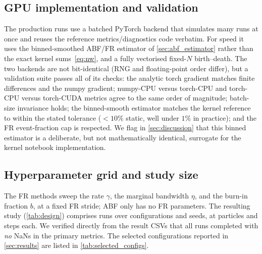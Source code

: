 \subsection{GPU implementation and validation}
The production runs use a batched PyTorch backend that simulates many runs at
once and reuses the reference metrics/diagnostics code verbatim. For speed it
uses the binned-smoothed ABF/FR estimator of \cref{sec:abf_estimator} rather
than the exact kernel sums~\eqref{eq:nw}, and a fully vectorised fixed-$N$
birth--death. The two backends are not bit-identical (RNG and floating-point
order differ), but a validation suite passes all of its checks: the analytic
torch gradient matches finite differences and the numpy gradient; numpy-CPU
versus torch-CPU and torch-CPU versus torch-CUDA metrics agree to the same
order of magnitude; batch-size invariance holds; the binned-smooth estimator
matches the kernel reference to within the stated tolerance ($<10\%$ static,
well under $1\%$ in practice); and the FR event-fraction cap is respected. We
flag in \cref{sec:discussion} that this binned estimator is a deliberate, but
not mathematically identical, surrogate for the kernel notebook implementation.

\subsection{Hyperparameter grid and study size}
The FR methods sweep the rate $\gamma$, the marginal bandwidth $\eta$, and the
burn-in fraction $b$, at a fixed FR stride; ABF only has no FR parameters. The
resulting study (\cref{tab:design}) comprises \NRuns{} runs over \NConfigs{}
configurations and \NSeeds{} seeds, at \NParticles{} particles and \NSteps{}
steps each. We verified directly from the result CSVs that all \NRuns{} runs
completed with \emph{no} NaNs in the primary metrics. The selected
configurations reported in \cref{sec:results} are listed in
\cref{tab:selected_configs}.



